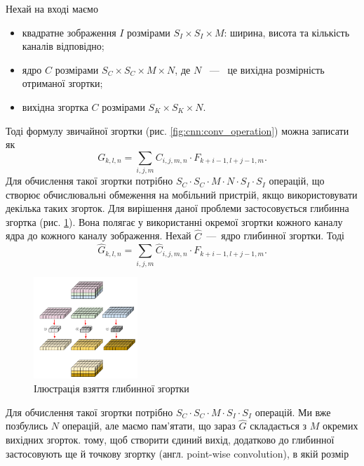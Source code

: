 Нехай на вході маємо
\begin{itemize}
    \item квадратне зображення $I$ розмірами $S_I \times S_I \times M$: ширина, висота та
          кількість каналів відповідно;
    \item ядро $C$ розмірами $S_C \times S_C \times M \times N$, де $N$ ~---~ це вихідна розмірність
          отриманої згортки;
    \item вихідна згортка $C$ розмірами $S_K \times S_K \times N$.
\end{itemize}
Тоді формулу звичайної згортки (рис. \ref{fig:cnn:conv_operation}) можна записати як
\begin{equation*}
    G_{k,l,n} = \sum_{i,j,m} C_{i,j,m,n} \cdot  F_{k+i-1, l+j-1,m}.
\end{equation*}
Для обчислення такої згортки потрібно $S_C \cdot  S_C \cdot  M \cdot  N \cdot  S_I \cdot  S_I$ операцій, що
створює обчислювальні обмеження на мобільний пристрій, якщо використовувати
декілька таких згорток.
Для вирішення даної проблеми застосовується глибинна згортка (рис. \ref{fig:cnn:deep_wise_conv}).
Вона полягає у використанні окремої згортки кожного каналу ядра до кожного каналу
зображення.
Нехай $\widehat{C}$~---~ядро глибинної згортки. Тоді
\begin{equation}
    \widehat{G}_{k,l,n} = \sum_{i,j,m} \widehat{C}_{i,j,m,n} \cdot  F_{k+i-1, l+j-1,m}.
\end{equation}
\begin{figure}[H]
    \centering
    \includegraphics[width=0.35\textwidth]{images/cnn_deep_wise_conv}
    \caption{Ілюстрація взяття глибинної згортки  \cite{website:deep_wise_sep_conv}
        \label{fig:cnn:deep_wise_conv}
    }
\end{figure}
Для обчислення такої згортки потрібно  $S_C \cdot  S_C \cdot  M \cdot  S_I \cdot  S_I$ операцій. Ми вже
позбулись $N$ операцій, але маємо пам'ятати, що
зараз $\widehat{G}$ складається з $M$ окремих вихідних згорток.
тому, щоб створити єдиний вихід, додатково до глибинної застосовують ще
й точкову згортку (англ. point-wise convolution), в якій розмір
